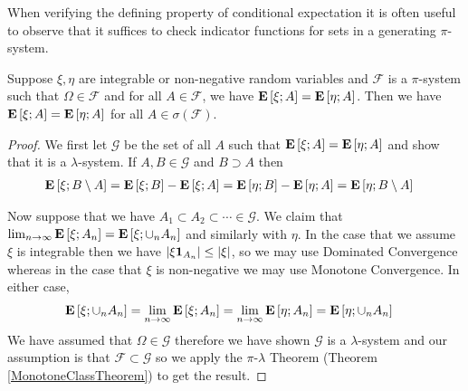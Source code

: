 When verifying the defining property of conditional expectation it is
often useful to observe that it suffices to check indicator functions
for sets in a generating $\pi$-system.
\begin{lem}\label{ConditionalExpectationExtension}Suppose $\xi, \eta$ are integrable or non-negative random
  variables and $\mathcal{F}$ is a $\pi$-system such that $\Omega \in
  \mathcal{F}$ and for all $A
  \in \mathcal{F}$, we have $\textbf{E}\left[\xi ; A\right] = \textbf{E}\left[
    \eta; A\right]$.  Then we have $\textbf{E}\left[\xi ; A\right] = \textbf{E}\left[
    \eta; A\right]$ for all $A \in \sigma(\mathcal{F})$.
\end{lem}
\begin{proof}We first let $\mathcal{G}$ be the set of all $A$ such that  $\textbf{E}\left[\xi ; A\right] = \textbf{E}\left[
    \eta; A\right]$ and show that it is a $\lambda$-system.  If $A, B \in
  \mathcal{G}$ and $B \supset A$ then
\begin{align*}
\textbf{E}\left[ \xi ; B\setminus A\right] &= \textbf{E}\left[\xi;B\right] -
\textbf{E}\left[\xi; A\right] = \textbf{E}\left[\eta;B\right] -
\textbf{E}\left[\eta; A\right] = \textbf{E}\left[ \eta ; B\setminus A\right]
\end{align*}

Now suppose that we have $A_1 \subset A_2 \subset \cdots \in
\mathcal{G}$.  We claim that $\lim_{n \to \infty} \textbf{E}\left[ \xi ;
  A_n\right] = \textbf{E}\left[ \xi ; \cup_n A_n\right]$ and similarly with $\eta$.
In the case that we assume $\xi$ is integrable then we have $\left \vert \xi
  \textbf{1}_{A_n} \right \vert \leq \left \vert \xi \right \vert$, so we may use Dominated
Convergence whereas in the case that $\xi$ is non-negative we may use
Monotone Convergence.  In either case,
\begin{align*}
\textbf{E}\left[ \xi ; \cup_n A_n\right] &= \lim_{n \to \infty} \textbf{E}\left[ \xi ;
  A_n\right] = \lim_{n \to \infty} \textbf{E}\left[ \eta ;
  A_n\right] = \textbf{E}\left[ \eta ; \cup_n A_n\right]
\end{align*}
We have assumed that $\Omega \in \mathcal{G}$ therefore we have shown $\mathcal{G}$ is a $\lambda$-system and our
assumption is that $\mathcal{F} \subset \mathcal{G}$ so we apply the
$\pi$-$\lambda$ Theorem (Theorem \ref{MonotoneClassTheorem}) to get
the result.
\end{proof}


